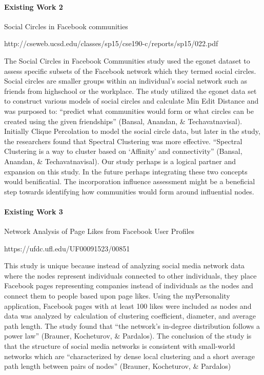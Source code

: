 \documentclass[11pt,twocolumn]{article}
\begin{document}
\paragraph{Existing Work 2 \cite{world-happiness-report-2018}} Social Circles in Facebook communities

http://cseweb.ucsd.edu/classes/sp15/cse190-c/reports/sp15/022.pdf

The Social Circles in Facebook Communities study used the egonet dataset to assess specific subsets of the Facebook network which they termed social circles. Social circles are smaller groups within an individual’s social network such as friends from highschool or the workplace. The study utilized the egonet data set to construct various models of social circles and calculate Min Edit Distance and was purposed to: “predict what communities would form or what circles can be created using the given friendships” (Bansal, Anandan, & Techavatnavisal). Initially Clique Percolation to model the social circle data, but later in the study, the researchers found that Spectral Clustering was more effective. “Spectral Clustering is a way to cluster based on ‘Affinity’ and connectivity” (Bansal, Anandan, & Techavatnavisal). Our study perhaps is a logical partner and expansion on this study. In the future perhaps integrating these two concepts would benificatial. The incorporation influence assessment might be a beneficial step towards identifying how communities would form around influential nodes.

\paragraph{Existing Work 3 \cite{world-happiness-report-2018}} Network Analysis of Page Likes from Facebook User Profiles

https://ufdc.ufl.edu/UF00091523/00851

This study is unique because instead of analyzing social media network data where the nodes represent individuals connected to other individuals, they place Facebook pages representing companies instead of individuals as the nodes and connect them to people based upon page likes. Using the myPersonality application, Facebook pages with at least 100 likes were included as nodes and data was analyzed by calculation of clustering coefficient, diameter, and average path length. The study found that “the network’s in-degree distribution follows a power law” (Brauner, Kocheturov, & Pardalos). The conclusion of the study is that the structure of social media networks is consistent with small-world networks which are “characterized by dense local clustering and a short average path length between pairs of nodes” (Brauner, Kocheturov, & Pardalos)
\end{document}
